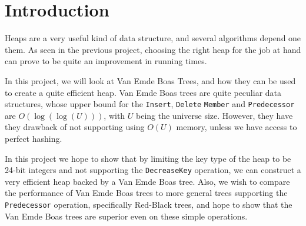 \section{Introduction}

Heaps are a very useful kind of data structure, and several algorithms depend one them. As seen in the previous project, choosing the right heap for the job at hand can prove to be quite an improvement in running times.

In this project, we will look at Van Emde Boas Trees, and how they can be used to create a quite efficient heap. Van Emde Boas trees are quite peculiar data structures, whose upper bound for the \texttt{Insert}, \texttt{Delete} \texttt{Member} and \texttt{Predecessor} are $O(\log ( \log (U)))$, with $U$ being the universe size. However, they have they drawback of not supporting  using $O(U)$ memory, unless we have access to perfect hashing.

In this project we hope to show that by limiting the key type of the heap to be 24-bit integers and not supporting the \texttt{DecreaseKey} operation, we can construct a very efficient heap backed by a Van Emde Boas tree. Also, we wish to compare the performance of Van Emde Boas trees to more general trees supporting the \texttt{Predecessor} operation, specifically Red-Black trees, and hope to show that the Van Emde Boas trees are superior even on these simple operations.